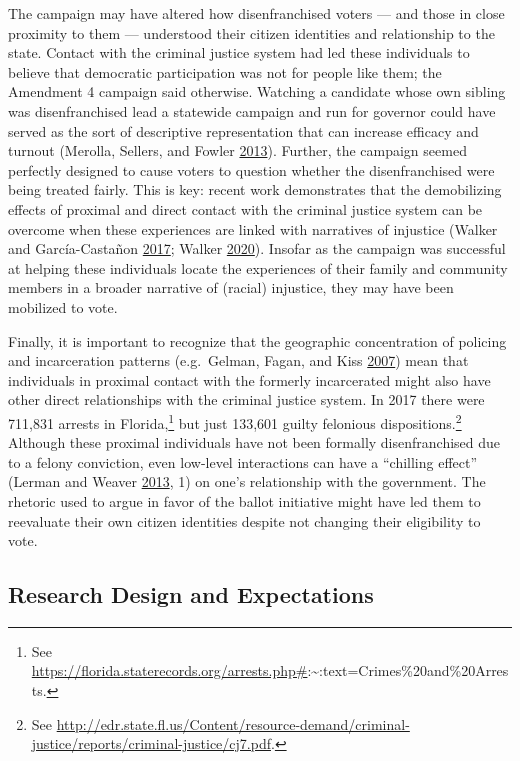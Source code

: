 \documentclass[
  12pt,
]{article}
\begin{document}
The campaign may have altered how disenfranchised voters --- and those in close proximity to them --- understood their citizen identities and relationship to the state. Contact with the criminal justice system had led these individuals to believe that democratic participation was not for people like them; the Amendment 4 campaign said otherwise. Watching a candidate whose own sibling was disenfranchised lead a statewide campaign and run for governor could have served as the sort of descriptive representation that can increase efficacy and turnout (Merolla, Sellers, and Fowler \protect\hyperlink{ref-Merolla2013}{2013}). Further, the campaign seemed perfectly designed to cause voters to question whether the disenfranchised were being treated fairly. This is key: recent work demonstrates that the demobilizing effects of proximal and direct contact with the criminal justice system can be overcome when these experiences are linked with narratives of injustice (Walker and García-Castañon \protect\hyperlink{ref-Walker2017}{2017}; Walker \protect\hyperlink{ref-Walker2020}{2020}). Insofar as the campaign was successful at helping these individuals locate the experiences of their family and community members in a broader narrative of (racial) injustice, they may have been mobilized to vote.

Finally, it is important to recognize that the geographic concentration of policing and incarceration patterns (e.g.~Gelman, Fagan, and Kiss \protect\hyperlink{ref-Gelman2007}{2007}) mean that individuals in proximal contact with the formerly incarcerated might also have other direct relationships with the criminal justice system. In 2017 there were 711,831 arrests in Florida,\footnote{See \url{https://florida.staterecords.org/arrests.php\#}:\textasciitilde:text=Crimes\%20and\%20Arrests.} but just 133,601 guilty felonious dispositions.\footnote{See \url{http://edr.state.fl.us/Content/resource-demand/criminal-justice/reports/criminal-justice/cj7.pdf}.} Although these proximal individuals have not been formally disenfranchised due to a felony conviction, even low-level interactions can have a ``chilling effect'' (Lerman and Weaver \protect\hyperlink{ref-Lerman2013}{2013}, 1) on one's relationship with the government. The rhetoric used to argue in favor of the ballot initiative might have led them to reevaluate their own citizen identities despite not changing their eligibility to vote.

\hypertarget{research-design-and-expectations}{%
\subsection*{Research Design and Expectations}\label{research-design-and-expectations}}
\end{document}

